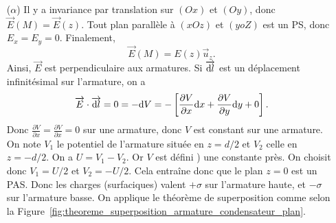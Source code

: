             \begin{enumerate}
                \item [($\alpha$)] Il y a invariance par translation sur $(Ox)$ et $(Oy)$, donc $\vec{E}(M)=\vec{E}(z)$. Tout plan parallèle à $(xOz)$ et $(yoZ)$ est un PS, donc $E_x=E_y=0$. Finalement,
                \begin{equation*}
                    \vec{E}(M)=E(z)\vec{u}_z.
                \end{equation*}
                Ainsi, $\vec{E}$ est perpendiculaire aux armatures. Si $\protect\overrightarrow{{\mathrm{d} l}}$ est un déplacement infinitésimal sur l'armature, on a 
                \begin{equation*}
                    \protect\overrightarrow{{E}}\cdot\protect\overrightarrow{{\mathrm{d} l}}=0=-\mathrm{d} V=-\left[
                        \frac{\partial V}{\partial x}\mathrm{d} x+\frac{\partial V}{\partial y}\mathrm{d} y+0
                    \right].
                \end{equation*}
                Donc $\frac{\partial V}{\partial x}=\frac{\partial V}{\partial x}=0$ sur une armature, donc $V$ est constant sur une armature. On note $V_1$ le potentiel de l'armature située en $z=d/2$ et $V_2$ celle en $z=-d/2$. On a $U=V_1-V_2$. Or $V$ est défini ) une constante près. On choisit donc $V_1=U/2$ et $V_2=-U/2$. Cela entraîne donc que le plan $z=0$ est un PAS. Donc les charges (surfaciques) valent $+\sigma$ sur l'armature haute, et $-\sigma$ sur l'armature basse. On applique le théorème de superposition comme selon la Figure~\ref{fig:theoreme_superposition_armature_condensateur_plan}.
                \begin{figure}
                    \centering
\end{figure}
\end{enumerate}
